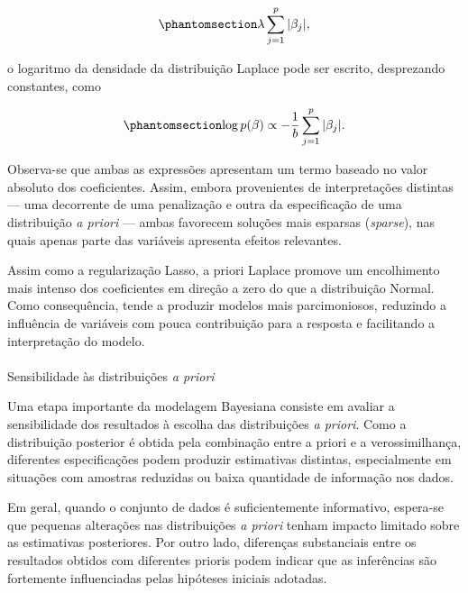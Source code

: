 \documentclass[
  brazilian,
  12pt,
  letterpaper,
  DIV=11,
  numbers=noendperiod]{scrartcl}
\makeatletter
\let\oldparagraph\paragraph
\renewcommand{\paragraph}{
    \@ifstar
      \xxxParagraphStar
      \xxxParagraphNoStar
  }
\newcommand{\xxxParagraphStar}[1]{\oldparagraph*{#1}\mbox{}}
\newcommand{\xxxParagraphNoStar}[1]{\oldparagraph{#1}\mbox{}}
\makeatother
\begin{document}
\begin{equation}\protect\phantomsection\label{eq-lasso}{
\lambda
\sum_{j=1}^{p}
|\beta_j|,
}\end{equation}

o logaritmo da densidade da distribuição Laplace pode ser escrito,
desprezando constantes, como

\begin{equation}\protect\phantomsection\label{eq-logprior-laplace}{
\log p(\beta)
\propto
-
\frac{1}{b}
\sum_{j=1}^{p}
|\beta_j|.
}\end{equation}

Observa-se que ambas as expressões apresentam um termo baseado no valor
absoluto dos coeficientes. Assim, embora provenientes de interpretações
distintas --- uma decorrente de uma penalização e outra da especificação
de uma distribuição \emph{a priori} --- ambas favorecem soluções mais
esparsas (\emph{sparse}), nas quais apenas parte das variáveis apresenta
efeitos relevantes.

Assim como a regularização Lasso, a priori Laplace promove um
encolhimento mais intenso dos coeficientes em direção a zero do que a
distribuição Normal. Como consequência, tende a produzir modelos mais
parcimoniosos, reduzindo a influência de variáveis com pouca
contribuição para a resposta e facilitando a interpretação do modelo.

\paragraph{\texorpdfstring{Sensibilidade às distribuições \emph{a
priori}}{Sensibilidade às distribuições a priori}}\label{sensibilidade-uxe0s-distribuiuxe7uxf5es-a-priori}

Uma etapa importante da modelagem Bayesiana consiste em avaliar a
sensibilidade dos resultados à escolha das distribuições \emph{a
priori}. Como a distribuição posterior é obtida pela combinação entre a
priori e a verossimilhança, diferentes especificações podem produzir
estimativas distintas, especialmente em situações com amostras reduzidas
ou baixa quantidade de informação nos dados.

Em geral, quando o conjunto de dados é suficientemente informativo,
espera-se que pequenas alterações nas distribuições \emph{a priori}
tenham impacto limitado sobre as estimativas posteriores. Por outro
lado, diferenças substanciais entre os resultados obtidos com diferentes
prioris podem indicar que as inferências são fortemente influenciadas
pelas hipóteses iniciais adotadas.
\end{document}
